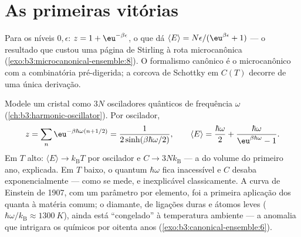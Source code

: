 \section{As primeiras vitórias}

\begin{example}\label{ex:b3:canonical-ensemble:twolevel}
Para os níveis $0, \epsilon$: $z = 1 + \eu^{-\beta\epsilon}$, o que dá
$\langle E\rangle = N\epsilon/(\eu^{\beta\epsilon} + 1)$ --- o
resultado que custou uma página de Stirling à rota microcanônica
(\cref{exo:b3:microcanonical-ensemble:8}). O formalismo canônico é o
microcanônico com a combinatória pré-digerida; a corcova de Schottky em
$C(T)$ decorre de uma única derivação.
\end{example}

\begin{example}\label{ex:b3:canonical-ensemble:einstein}
Modele um cristal como $3N$ osciladores quânticos de frequência
$\omega$ (\cref{ch:b3:harmonic-oscillator}). Por oscilador,
\[
z = \sum_n\eu^{-\beta\hbar\omega(n + 1/2)}
 = \frac{1}{2\sinh(\beta\hbar\omega/2)} , \qquad
\langle E\rangle = \frac{\hbar\omega}{2} +
\frac{\hbar\omega}{\eu^{\beta\hbar\omega} - 1} .
\]
Em $T$ alto: $\langle E\rangle \to k_{\text{B}}T$ por oscilador e
$C \to 3Nk_{\text{B}}$ --- a  do volume do primeiro
ano, explicada. Em $T$ baixo, o quantum $\hbar\omega$ fica inacessível
e $C$ desaba exponencialmente --- como se mede, e inexplicável
classicamente. A curva de Einstein de 1907, com um parâmetro por
elemento, foi a primeira aplicação dos quanta à matéria comum; o
diamante, de ligações duras e átomos leves ($\hbar\omega/k_{\text{B}}
\approx \qty{1300}{K}$), ainda está
``congelado'' à temperatura ambiente --- a anomalia que intrigara os
químicos por oitenta anos (\cref{exo:b3:canonical-ensemble:6}).
\end{example}

